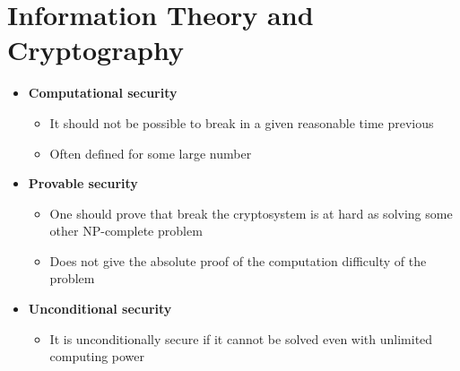 \section{Information Theory and Cryptography} 
\begin{itemize}
  \item \textbf{Computational security} 
  \begin{itemize}
    \item It should not be possible to break in a given reasonable time previous
    \item Often defined for some large number
  \end{itemize}
  \item \textbf{Provable security} 
  \begin{itemize}
  	\item One should prove that break the cryptosystem is at hard as solving some other NP-complete problem
  	\item Does not give the absolute proof of the computation difficulty of the problem
  \end{itemize}
  \item \textbf{Unconditional security}
  \begin{itemize}
	  \item It is unconditionally secure if it cannot be solved even with unlimited computing power
  \end{itemize}
\end{itemize}

